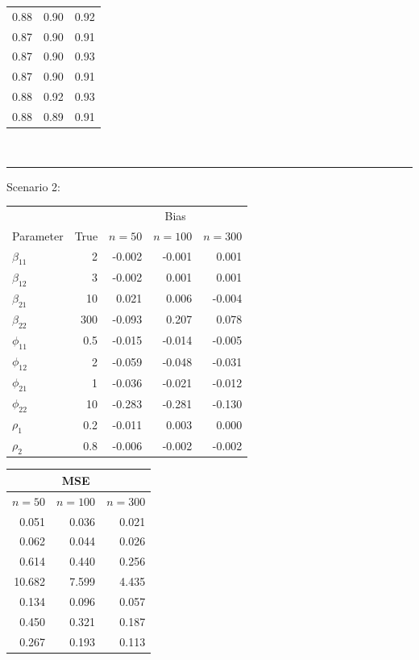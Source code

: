 \documentclass[useAMS,referee]{biom}
\begin{document}
\begin{table}[htb]
\begin{minipage}[b]{.1\textwidth}
\begin{tabular}{rrr}
	0.88&	0.90&	0.92\\
	0.87&	0.90&	0.91\\
	0.87&	0.90&	0.93\\
	0.87&	0.90&	0.91\\
	0.88&	0.92&	0.93\\
	0.88&	0.89&	0.91\\
\end{tabular}
\end{minipage}
\\\hrule\vspace{0.2cm}
Scenario 2:\\
\begin{minipage}[b]{.43\textwidth}
\begin{tabular}{lrrrr} 
	& &   \multicolumn{3}{c}{Bias}  \\ 
	\cmidrule{3-5}
	Parameter	&  True & $n=50$ & $n=100$ & $n=300$   \\ 			\midrule 
	$\beta_{11}$ &	2&-0.002&	-0.001&	0.001\\
	$\beta_{12}$ &	3&-0.002&	0.001&	0.001\\
	$\beta_{21}$&10& 0.021&	0.006&	-0.004\\
	$\beta_{22}$&300&-0.093&	0.207&	0.078\\
	$\phi_{11}$	&0.5&-0.015&	-0.014&	-0.005\\
	$\phi_{12}$&2&	-0.059&	-0.048&	-0.031\\
	$\phi_{21}$	&1&	-0.036&	-0.021&	-0.012\\
	$\phi_{22}$	&10&-0.283&	-0.281&	-0.130\\
	$\rho_1$	&0.2&-0.011&	0.003&	0.000\\
	$\rho_2$&	0.8	&-0.006&	-0.002&	-0.002\\
\end{tabular}
\end{minipage}
\begin{minipage}[b]{.28\textwidth}
\begin{tabular}{rrr} 
	& \multicolumn{1}{c}{MSE} & \\ 
	\hline
	$n=50$ & $n=100$ & $n=300$   \\ 	
	\midrule 
	0.051&	0.036&	0.021\\
	0.062&	0.044&	0.026\\
	0.614&	0.440&	0.256\\
	10.682&	7.599&	4.435\\
	0.134&	0.096&	0.057\\
	0.450&	0.321&	0.187\\
	0.267&	0.193&	0.113\\

\end{tabular}
\end{minipage}
\end{table}
\end{document}
